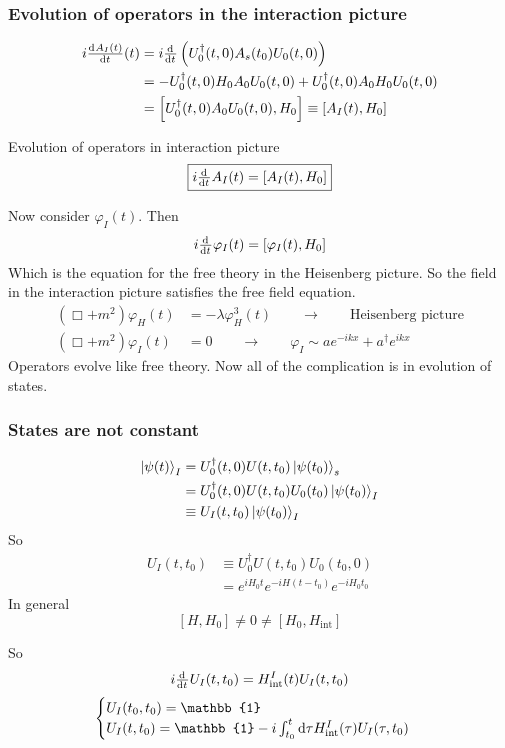 \subsubsection{Evolution of operators in the interaction picture}
\begin{align*} i \od{A_I(t)}{t}(t) &= i \od{}{t}\left(U_0^\dagger(t,0)A_s(t_0)U_0(t,0)\right) \\
&= - U_0^\dagger(t,0)H_0A_0U_0(t,0) + U_0^\dagger(t,0)A_0H_0U_0(t,0) \\
&= \left[U^\dagger_0(t,0)A_0U_0(t,0),H_0\right] \equiv \left[A_I(t),H_0\right]
\end{align*}

Evolution of operators in interaction picture
\[ \boxed{i \od{}{t}A_I(t) = \left[A_I(t),H_0\right]} \]

Now consider $\varphi_I(t)$. Then
\[ i \od{}{t}\varphi_I(t) = \left[\varphi_I(t),H_0\right] \]
Which is the equation for the free theory in the Heisenberg picture. So the field in the interaction picture satisfies the free field equation.
\begin{align*}
\left(\Box + m^2\right)\varphi_H(t) &= -\lambda\varphi_H^3(t) \qquad \to \qquad \text{Heisenberg picture} \\
\left(\Box + m^2\right)\varphi_I(t) &= 0 \qquad \to \qquad \varphi_I \sim ae^{-ikx} + a^\dagger e^{ikx}
\end{align*}
Operators evolve like free theory. Now all of the complication is in evolution of states.

\subsubsection{States are not constant}
\begin{align*}
\left| \psi(t) \right\rangle_I &= U_0^\dagger(t,0)U(t,t_0)\left| \psi(t_0) \right\rangle_s \\
&= U_0^\dagger (t,0)U(t,t_0)U_0(t_0)\left| \psi(t_0) \right\rangle_I \\
&\equiv U_I(t,t_0)\left| \psi(t_0) \right\rangle_I
\end{align*}
So
\begin{align*}
U_I(t,t_0) &\equiv U_0^\dagger U(t,t_0)U_0(t_0,0) \\
&= e^{iH_0t}e^{-iH(t-t_0)}e^{-iH_0t_0}
\end{align*}
In general
\[ \left[H,H_0\right] \neq 0 \neq \left[H_0,H_\text{int}\right] \]

So
\[ i \od{}{t}U_I(t,t_0) = H^I_\text{int}(t)U_I(t,t_0) \]
\[ \begin{cases}
U_I(t_0,t_0) = \mathbb{1} \\
U_I(t,t_0) = \mathbb{1} - i \int^t_{t_0}\diff{\tau}H_\text{int}^I(\tau)U_I(\tau,t_0)
\end{cases} \]

